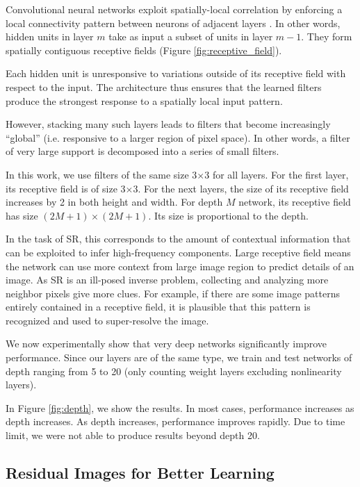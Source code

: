 \documentclass[10pt,twocolumn,letterpaper]{article}
\begin{document}
Convolutional neural networks exploit spatially-local correlation by enforcing a local connectivity pattern between neurons of adjacent layers \cite{Bengio-et-al-2015-Book}. In other words, hidden units in layer $m$ take as input a subset of units in layer $m-1$. They form spatially contiguous receptive fields (Figure \ref{fig:receptive_field}).

Each hidden unit is unresponsive to variations outside of its receptive field with respect to the input. The architecture thus ensures that the learned filters produce the strongest response to a spatially local input pattern.

However, stacking many such layers leads to filters that become increasingly “global” (i.e. responsive to a larger region of pixel space). In other words, a filter of very large support is decomposed into a series of small filters. 

In this work, we use filters of the same size 3$\times$3 for all layers. For the first layer, its receptive field is of size 3$\times$3. For the next layers, the size of its receptive field increases by 2 in both height and width. For depth $M$ network, its receptive field has size $(2M+1)\times(2M+1)$. Its size is proportional to the depth.

In the task of SR, this corresponds to the amount of contextual information that can be exploited to infer high-frequency components. Large receptive field means the network can use more context from large image region to predict details of an image. As SR is an ill-posed inverse problem, collecting and analyzing more neighbor pixels give more clues. For example, if there are some image patterns entirely contained in a receptive field, it is plausible that this pattern is recognized and used to super-resolve the image. 

We now experimentally show that very deep networks significantly improve performance.  Since our layers are of the same type, we train and test networks of depth ranging from 5 to 20 (only counting weight layers excluding nonlinearity layers). 

In Figure \ref{fig:depth}, we show the results. In most cases, performance increases as depth increases. As depth increases, performance improves rapidly. Due to time limit, we were not able to produce results beyond depth 20. 


\subsection{Residual Images for Better Learning}
\label{sec:residual}
\end{document}
